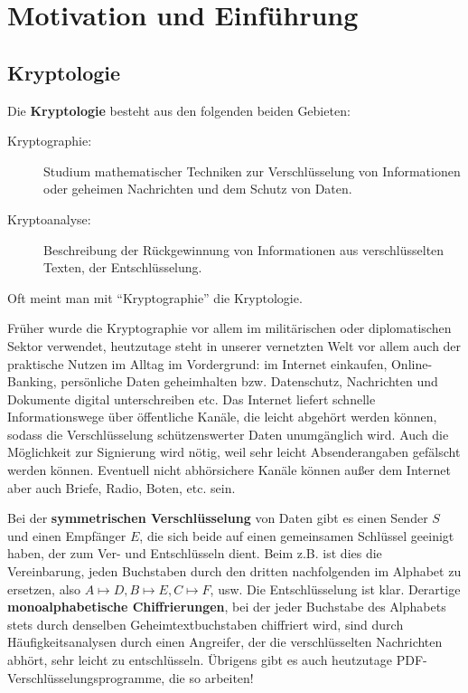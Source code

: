 \setcounter{section}{-1}
\section{Motivation und Einführung}
\label{sec:para0}

\nextlecture
\subsection*{Kryptologie}
	Die \textbf{Kryptologie} besteht aus den folgenden beiden Gebieten: \marginnote{[1]} 
	\begin{description}
		\item[Kryptographie:] Studium mathematischer Techniken zur Verschlüsselung von Informationen oder geheimen Nachrichten und dem Schutz von Daten.
		\item[Kryptoanalyse:] Beschreibung der Rückgewinnung von Informationen aus verschlüsselten Texten, der Entschlüsselung.
	\end{description}
Oft meint man mit \enquote{Kryptographie} die Kryptologie.

Früher wurde die Kryptographie vor allem im militärischen oder diplomatischen Sektor verwendet, heutzutage steht in unserer vernetzten Welt vor allem auch der praktische Nutzen im Alltag im Vordergrund: im Internet einkaufen, Online-Banking, persönliche Daten geheimhalten bzw. Datenschutz, Nachrichten und Dokumente digital unterschreiben etc. 
Das Internet liefert schnelle Informationswege über öffentliche Kanäle, die leicht abgehört werden können, sodass die Verschlüsselung schützenswerter Daten unumgänglich wird. 
Auch die Möglichkeit zur Signierung wird nötig, weil sehr leicht Absenderangaben gefälscht werden können. 
Eventuell nicht abhörsichere Kanäle können außer dem Internet aber auch Briefe, Radio, Boten, etc. sein. 

Bei der \textbf{symmetrischen Verschlüsselung} von Daten gibt es einen Sender $S$ und einen Empfänger $E$, die sich beide auf einen gemeinsamen Schlüssel geeinigt haben, der zum Ver- und Entschlüsseln dient. 
Beim  z.B. ist dies die Vereinbarung, jeden Buchstaben durch den dritten nachfolgenden im Alphabet zu ersetzen, also $A \mapsto D, B \mapsto E, C \mapsto F$, usw. 
Die Entschlüsselung ist klar. 
Derartige \textbf{monoalphabetische Chiffrierungen}, bei der jeder Buchstabe des Alphabets stets durch denselben Geheimtextbuchstaben chiffriert wird, sind durch Häufigkeitsanalysen durch einen Angreifer, der die verschlüsselten Nachrichten abhört, sehr leicht zu entschlüsseln. 
Übrigens gibt es auch heutzutage PDF-Verschlüsselungsprogramme, die so arbeiten! 

